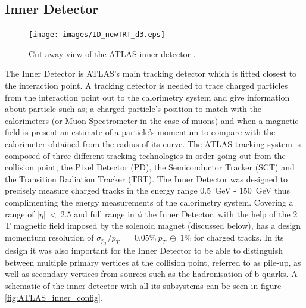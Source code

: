 	\subsection{Inner Detector}

		\begin{figure}[h!]
			\begin{center}
				\texttt{[image: images/ID\_newTRT\_d3.eps]}
			\end{center}
			\caption{Cut-away view of the ATLAS inner detector \cite{Aad:1129811}.}
			\label{fig:ATLAS_inner}
		\end{figure}

		The Inner Detector is ATLAS's main tracking detector which is fitted closest to the interaction point. A tracking detector is needed to trace charged particles from the interaction point out to the calorimetry system and give information about particle such as; a charged particle's position to match with the calorimeters (or Muon Spectrometer in the case of muons) and when a magnetic field is present an estimate of a particle's momentum to compare with the calorimeter obtained from the radius of its curve. The  ATLAS tracking system is composed of three different tracking technologies in order going out from the collision point; the Pixel Detector (PD), the Semiconductor Tracker (SCT) and the Transition Radiation Tracker (TRT). The Inner Detector was designed to precisely measure charged tracks in the energy range 0.5~GeV - 150~GeV thus complimenting the energy measurements of the calorimetry system. Covering a range of $|\eta|~<~2.5$ and full range in $\phi$ the Inner Detector, with the help of the 2 T magnetic field imposed by the solenoid magnet (discussed below), has a design momentum resolution of $\sigma_{p_{T}}/p_{T}~=~0.05\%~p_{T}~\oplus~1\%$ for charged tracks. In its design it was also important for the Inner Detector to be able to distinguish between multiple primary vertices at the collision point, referred to as pile-up, as well as secondary vertices from sources such as the hadronisation of b quarks. A schematic of the inner detector with all its subsystems can be seen in figure \ref{fig:ATLAS_inner_config}.

